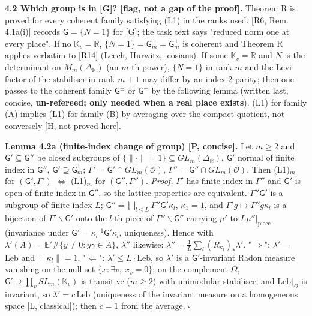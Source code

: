 \textbf{4.2 Which group is in {[}G{]}? {[}flag, not a gap of the proof{]}.} Theorem R is proved for every coherent family satisfying (L1) in the ranks used. {[}R6, Rem. 4.1a(i){]} records \(\mathsf G=\{N=1\}\) for {[}G{]}; the task text says "reduced norm one at every place". If no \(\mathbb K_v=\mathbb R\), \(\{N=1\}=\mathsf G^+_m=\mathsf G^\pm_m\) is coherent and Theorem R applies verbatim to {[}R14{]} (Leech, Hurwitz, icosians). If some \(\mathbb K_v=\mathbb R\) and \(N\) is the determinant on \(M_m(\Delta_{\mathbb R})\) (an \(m\)-th power), \(\{N=1\}\) in rank \(m\) and the Levi factor of the stabiliser in rank \(m+1\) may differ by an index-2 parity; then one passes to the coherent family \(\mathsf G^\pm\) or \(\mathsf G^+\) by the following lemma (written last, concise, \textbf{un-refereed; only needed when a real place exists}). (L1) for family (A) implies (L1) for family (B) by averaging over the compact quotient, not conversely {[}H, not proved here{]}.

\textbf{Lemma 4.2a (finite-index change of group) {[}P, concise{]}.} Let \(m\ge2\) and \(\mathsf G'\subseteq\mathsf G''\) be closed subgroups of \(\{\|\cdot\|=1\}\subseteq GL_m(\Delta_{\mathbb R})\), \(\mathsf G'\) normal of finite index in \(\mathsf G''\), \(\mathsf G'\supseteq\mathsf G^1_m\); \(\Gamma'=\mathsf G'\cap GL_m(\mathcal O)\), \(\Gamma''=\mathsf G''\cap GL_m(\mathcal O)\). Then (L1)\(_m\) for \((\mathsf G',\Gamma')\) \(\iff\) (L1)\(_m\) for \((\mathsf G'',\Gamma'')\).
\emph{Proof.} \(\Gamma'\) has finite index in \(\Gamma''\) and \(\mathsf G'\) is open of finite index in \(\mathsf G''\), so the lattice properties are equivalent. \(\Gamma''\mathsf G'\) is a subgroup of finite index \(L\); \(\mathsf G''=\bigsqcup_{l\le L}\Gamma''\mathsf G'\kappa_l\), \(\kappa_1=1\), and \(\Gamma'g\mapsto\Gamma''g\kappa_l\) is a bijection of \(\Gamma'\backslash\mathsf G'\) onto the \(l\)-th piece of \(\Gamma''\backslash\mathsf G''\) carrying \(\mu'\) to \(L\mu''|_{\text{piece}}\) (invariance under \(\mathsf G'=\kappa_l^{-1}\mathsf G'\kappa_l\), uniqueness). Hence with \(\lambda'(A)=\mathbb E'\#\{y\ne0:y\gamma\in A\}\), \(\lambda''\) likewise: \(\lambda''=\frac1L\sum_l(R_{\kappa_l})_*\lambda'\). "\(\Rightarrow\)": \(\lambda'=\) Leb and \(\|\kappa_l\|=1\). "\(\Leftarrow\)": \(\lambda'\le L\cdot\)Leb, so \(\lambda'\) is a \(\mathsf G'\)-invariant Radon measure vanishing on the null set \(\{x:\exists v,\ x_v=0\}\); on the complement \(\Omega\), \(\mathsf G'\supseteq\prod_vSL_m(\mathbb K_v)\) is transitive (\(m\ge2\)) with unimodular stabiliser, and Leb\(|_\Omega\) is invariant, so \(\lambda'=c\,\)Leb (uniqueness of the invariant measure on a homogeneous space {[}L, classical{]}); then \(c=1\) from the average. \(\square\)

